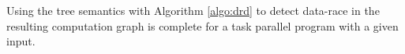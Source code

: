 \begin{theorem} \label{thm:graph}
Using the tree semantics with Algorithm \ref{algo:drd} to detect data-race in the resulting computation graph is complete for a task parallel program with a given input.
\end{theorem}

